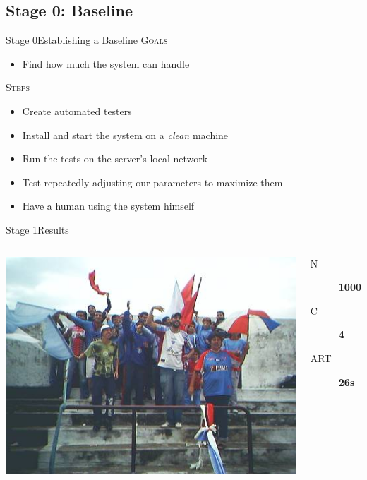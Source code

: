 \documentclass[utf8,hyperref={colorlinks=true}]{beamer}
\begin{document}
\subsection{Stage 0: Baseline}
\begin{frame}{Stage 0}{Establishing a Baseline}
	\textsc{Goals}
	\begin{itemize}
		\item Find how much the system can handle
	\end{itemize}
	\pause
	\textsc{Steps}
	\begin{itemize}
		\item Create automated testers
		\item Install and start the system on a \emph{clean} machine
		\item Run the tests on the server's local network
		\item Test repeatedly adjusting our parameters to maximize them
		\item Have a human using the system himself
	\end{itemize}
\end{frame}
\begin{frame}{Stage 1}{Results}
	\begin{columns}
			\includegraphics[top=-1,width=\textwidth]{img/results-1.jpg}
			\begin{description}
				\item[N] \textbf{\color{red}\Large 1000}
				\item[C] \textbf{\color{red}\Large 4}
				\item[ART] \textbf{\color{red}\Large 26s}
			\end{description}
	\end{columns}
\end{frame}
\end{document}
